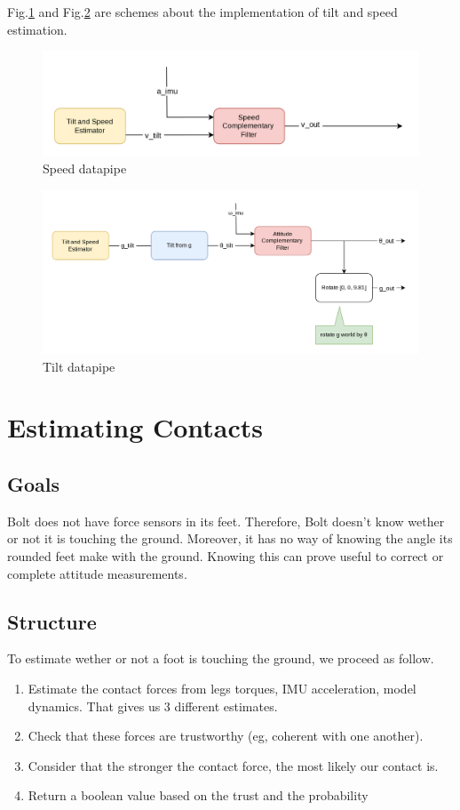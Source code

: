 \documentclass[a4paper,10pt]{article}
\begin{document}
Fig.\ref{fig:speed_datapipe} and Fig.\ref{fig:tilt_datapipe} are schemes about the implementation of tilt and speed estimation.

\begin{figure}[H]
\centering
  \includegraphics[width=0.9\linewidth]{./images/Variable_Speed.png}
  \caption{Speed datapipe}
  \label{fig:speed_datapipe}
\end{figure}

\begin{figure}[H]
\centering
  \includegraphics[width=\linewidth]{./images/Variable_Attitude.png}
  \caption{Tilt datapipe}
  \label{fig:tilt_datapipe}
\end{figure}


\section{Estimating Contacts}
\subsection{Goals}
Bolt does not have force sensors in its feet. Therefore, Bolt doesn't know wether or not it is touching the ground. Moreover, it has no way of knowing the angle its rounded feet make with the ground. Knowing this can prove useful to correct or complete attitude measurements.

\subsection{Structure}
To estimate wether or not a foot is touching the ground, we proceed as follow.
\begin{enumerate}[noitemsep,topsep=0.5pt,parsep=0.1pt,partopsep=0.1pt]
	\item Estimate the contact forces from legs torques, IMU acceleration, model dynamics. That gives us 3 different estimates.
	\item Check that these forces are trustworthy (eg, coherent with one another).
	\item Consider that the stronger the contact force, the most likely our contact is.
	\item Return a boolean value based on the trust and the probability
\end{enumerate}
\end{document}
